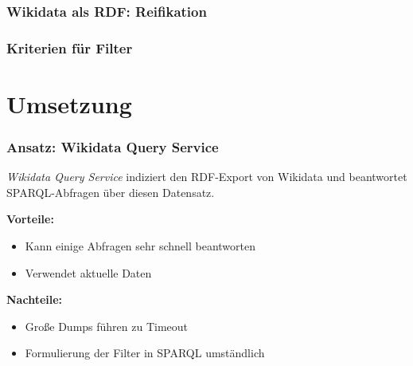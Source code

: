 \documentclass[aspectratio=1609,xcolor=usenames,dvipsnames,svgnames]{beamer}
\begin{document}
\begin{frame}[t, fragile]\frametitle{Wikidata als RDF: Reifikation}
  \vspace{0.25cm}
  
\end{frame}

\begin{frame}\frametitle{Kriterien für Filter}
\end{frame}


\section{Umsetzung}

\begin{frame}\frametitle{Ansatz: Wikidata Query Service}
  \emph{Wikidata Query Service} indiziert den RDF-Export von Wikidata und
  beantwortet SPARQL-Abfragen über diesen Datensatz.

  \textbf{Vorteile:}
  \begin{itemize}
    \item Kann einige Abfragen sehr schnell beantworten
    \item Verwendet aktuelle Daten
  \end{itemize}
  \textbf{Nachteile:}
  \begin{itemize}
    \item Große Dumps führen zu Timeout
    \item Formulierung der Filter in SPARQL umständlich
  \end{itemize}

\end{frame}
\end{document}
